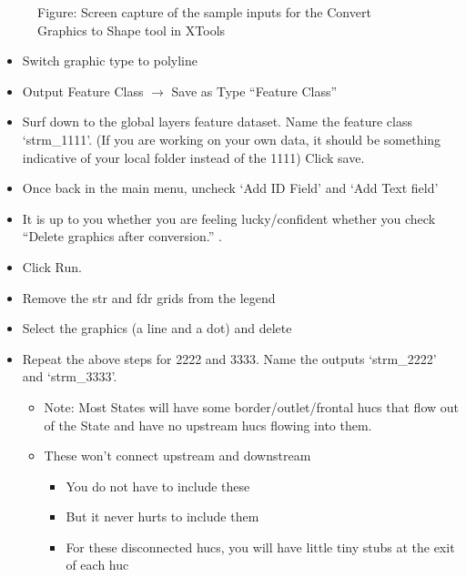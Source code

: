 \documentclass[letterpaper,10pt,english]{sphinxmanual}
\begin{document}
\begin{figure}[htbp]
\centering
\capstart

\noindent{}
\caption{Figure: Screen capture of the sample inputs for the Convert Graphics to Shape tool in XTools}\label{\detokenize{ex_2:id24}}\end{figure}
\begin{itemize}
\item {} 
Switch graphic type to polyline

\item {} 
Output Feature Class \(\rightarrow\)  Save as Type “Feature Class”

\item {} 
Surf down to the global layers feature dataset.  Name the feature class ‘strm\_1111’.  (If you are working on your own data, it should be something indicative of your local folder instead of the 1111) Click save.

\item {} 
Once back in the main menu, uncheck ‘Add ID Field’ and ‘Add Text field’

\item {} 
It is up to you whether you are feeling lucky/confident whether you check “Delete graphics after conversion.” .

\item {} 
Click Run.

\item {} 
Remove the str and fdr grids from the legend

\item {} 
Select the graphics (a line and a dot) and delete

\item {} 
Repeat the above steps for 2222 and 3333. Name the outputs ‘strm\_2222’ and ‘strm\_3333’.
\begin{itemize}
\item {} 
Note: Most States will have some border/outlet/frontal hucs that flow out of the State and have no upstream hucs flowing into them.

\item {} 
These won’t connect upstream and downstream
\begin{itemize}
\item {} 
You do not have to include these

\item {} 
But it never hurts to include them

\item {} 
For these disconnected hucs, you will have little tiny stubs at the exit of each huc


\end{itemize}
\end{itemize}
\end{itemize}
\end{document}

